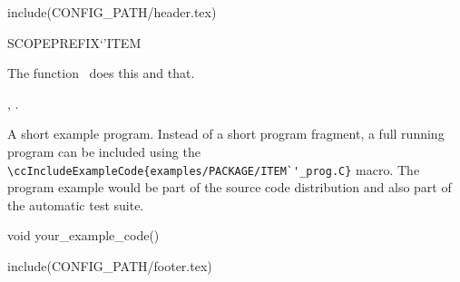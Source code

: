 include(CONFIG_PATH/header.tex)
\begin{ccRefFunction}SCOPE{PREFIX`'ITEM}  %


\ccDefinition
  
The function \ccRefName\ does this and that.



\ccIsModel


\ccSeeAlso

,
.

\ccExample

A short example program.
Instead of a short program fragment, a full running program can be
included using the 
\verb|\ccIncludeExampleCode{examples/PACKAGE/ITEM`'_prog.C}| 
macro. The program example would be part of the source code distribution and
also part of the automatic test suite.

\begin{ccExampleCode}
void your_example_code() {
}
\end{ccExampleCode}


\end{ccRefFunction}

include(CONFIG_PATH/footer.tex)
